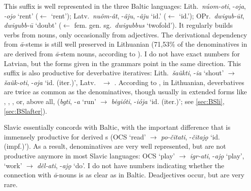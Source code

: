 \documentclass[output=paper,colorlinks,citecolor=brown]{langscibook}
\begin{document}
This suffix is well represented in the three Baltic languages: Lith.\ \textit{núom-oti}, -\textit{oja}, \textit{-ojo} ‘rent’ ($\leftarrow$  ‘rent’); Latv.\ \textit{nuõm-ât}, -\textit{ãju}, -\textit{ãju} ‘id.’ ($\leftarrow$  ‘id.’); OPr.\ \textit{dwigub-ūt}, \textit{dwigubb-ū}  ‘doubt’ ($\leftarrow$ fem. gen. sg.\ \textit{dwigubbus} ‘twofold’). It regularly builds verbs from nouns, only occasionally from adjectives. The derivational dependency from \textit{ā}-stems is still well preserved in Lithuanian (71,53\% of the denominatives in  are derived from \textit{ā}-stem nouns, according to \citealt[281]{Pakerys2011}). I do not have exact numbers for Latvian, but the forms given in the grammars point in the same direction. This suffix is also productive for deverbative iteratives: Lith.\ \textit{šaũkti}, -\textit{ia} ‘shout’ $\rightarrow$ \textit{šaũk-oti}, -\textit{oja} ‘id. (iter.)’, Latv.\  $\rightarrow$ . According to \citet[34]{Jakaitiene1973}, in Lithuanian, deverbatives are twice as common as the denominatives, though usually in extended forms like , , ,  or, above all,  (\textit{bgti}, -\textit{a} ‘run’ $\rightarrow$ \textit{b\.egióti}, -\textit{iója} ‘id. (iter.)’; see \ref{sec:BSli}, \ref{sec:BSlafter}).

Slavic essentially concords with Baltic, with the important difference that  is immensely productive for derived s (OCS  ‘read’ $\rightarrow$ \textit{po-čitati}, -\textit{čitajǫ} ‘id. (impf.)’). As a result, denominatives are very well represented, but are not productive anymore in most Slavic languages: OCS  ‘play’ $\rightarrow$ \textit{igr\nobreakdash-ati}, -\textit{ajǫ} ‘play’,  ‘work’ $\rightarrow$ \textit{děl-ati}, -\textit{ajǫ} ‘do’. I do not have numbers indicating whether the connection with \textit{ā}-nouns is as clear as in Baltic. Deadjectives occur, but are very rare.
\end{document}
